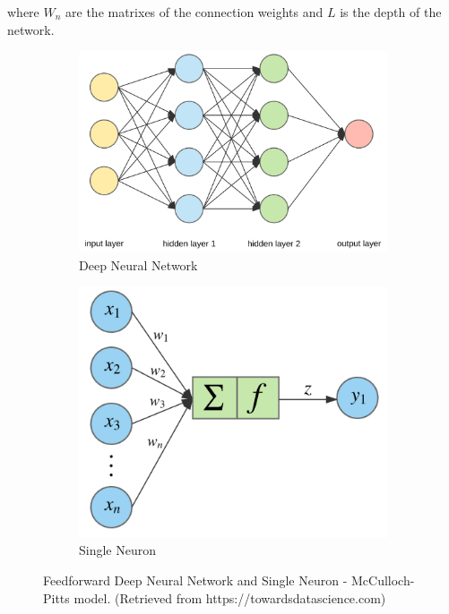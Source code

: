 where $W_n$ are the matrixes of the connection weights and $L$ is the depth of the network. 




\begin{figure}[b]
	\centering
	\begin{subfigure}[b]{0.4\textwidth}
		\includegraphics[width=\textwidth]{network}
		\caption{Deep Neural Network}
		\label{neural:net}
	\end{subfigure}
	\begin{subfigure}[b]{0.4\textwidth}
		\includegraphics[width=\textwidth]{neuron}
		\caption{Single Neuron}
		\label{neural:neur}
	\end{subfigure}
	\caption{Feedforward Deep Neural Network and Single Neuron - McCulloch-Pitts model. (Retrieved from https://towardsdatascience.com)}
	\label{neural}
\end{figure}

